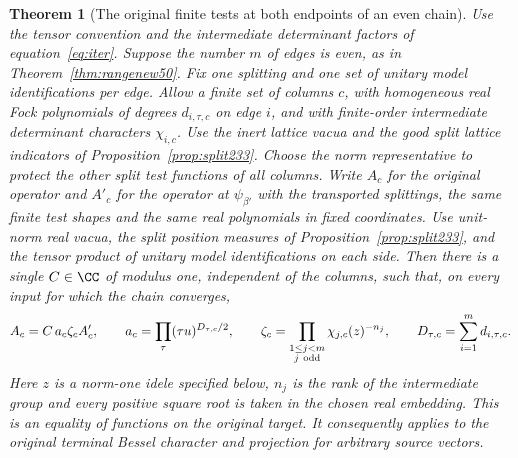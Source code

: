 \documentclass[a4paper,11pt]{article}
\newtheorem{theorem}[proposition]{Theorem}
\theoremstyle{definition}
\theoremstyle{remark}
\numberwithin{equation}{section}
\begin{document}
\begin{theorem}[The original finite tests at both endpoints of an even chain]
\label{thm:even233}
Use the tensor convention and the intermediate determinant factors
of equation~\eqref{eq:iter}. Suppose the number \(m\) of
edges is even, as in Theorem~\ref{thm:rangenew50}. Fix
one splitting and one set of unitary model identifications per edge.
Allow a finite set of columns \(c\), with homogeneous real Fock
polynomials of degrees \(d_{i,\tau,c}\) on edge \(i\), and with
finite-order intermediate determinant characters \(\chi_{i,c}\).
Use the inert lattice vacua and the good split lattice indicators of
Proposition~\ref{prop:split233}. Choose the norm representative to
protect the other split test functions of all columns. Write \(A_c\)
for the original operator and
\(A'_c\) for the operator at \(\psi_{\beta'}\) with the transported
splittings, the same finite test shapes and the same real polynomials
in fixed coordinates. Use unit-norm real vacua, the split position
measures of Proposition~\ref{prop:split233}, and the tensor product
of unitary model identifications on each side. Then there is a
single \(C\in\CC\) of modulus one, independent of the columns,
such that, on every input for which the chain converges,
\[
  A_c=C\,a_c\zeta_c A'_c,\qquad
  a_c=\prod_{\tau}(\tau u)^{D_{\tau,c}/2},\qquad
  \zeta_c=\prod_{\substack{1\le j<m\\ j\ {\rm odd}}}
                       \chi_{j,c}(z)^{-n_j},\qquad
  D_{\tau,c}=\sum_{i=1}^m d_{i,\tau,c}.
\]
Here \(z\) is a norm-one idele specified below, \(n_j\) is the rank
of the intermediate group and every positive square root is taken
in the chosen real embedding. This is an equality of functions on
the original target. It consequently applies to the original
terminal Bessel character and projection for arbitrary source vectors.
\end{theorem}
\end{document}
